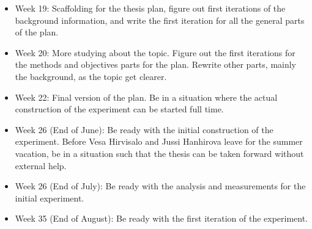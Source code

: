 
\begin{itemize}
\item Week 19: Scaffolding for the thesis plan, figure out first iterations of the background information, and write the first iteration for all the general parts of the plan.
\item Week 20: More studying about the topic. Figure out the first iterations for the methods and objectives parts for the plan. Rewrite other parts, mainly the background, as the topic get clearer.
\item Week 22: Final version of the plan. Be in a situation where the actual construction of the experiment can be started full time.
\item Week 26 (End of June): Be ready with the initial construction of the experiment. Before Vesa Hirvisalo and Jussi Hanhirova leave for the summer vacation, be in a situation such that the thesis can be taken forward without external help.
\item Week 26 (End of July): Be ready with the analysis and measurements for the initial experiment.
\item Week 35 (End of August): Be ready with the first iteration of the experiment.
\end{itemize}
